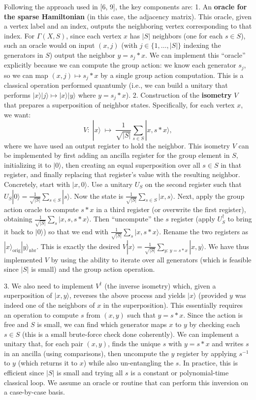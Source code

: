 \documentclass[11pt]{article}
\theoremstyle{definition}
\begin{document}
Following the approach used in [6, 9], the key components are:
1. An \textbf{oracle for the sparse Hamiltonian} (in this case, the adjacency matrix). This oracle, given a vertex label and an index, outputs the neighboring vertex corresponding to that index. For $\Gamma(X,S)$, since each vertex $x$ has $|S|$ neighbors (one for each $s \in S$), such an oracle would on input $(x, j)$ (with $j \in \{1,\dots,|S|\}$ indexing the generators in $S$) output the neighbor $y = s_j * x$. We can implement this “oracle” explicitly because we can compute the group action: we know each generator $s_j$, so we can map $(x, j) \mapsto s_j * x$ by a single group action computation. This is a classical operation performed quantumly (i.e., we can build a unitary that performs $|x\rangle|j\rangle \mapsto |x\rangle |y\rangle$ where $y = s_j * x$).
2. Construction of the \textbf{isometry} $V$ that prepares a superposition of neighbor states. Specifically, for each vertex $x$, we want:
\[ V:\; |x\rangle \;\mapsto\; \frac{1}{\sqrt{|S|}} \sum_{s \in S} |x, s* x\rangle, \] 
where we have used an output register to hold the neighbor. This isometry $V$ can be implemented by first adding an ancilla register for the group element in $S$, initializing it to $|0\rangle$, then creating an equal superposition over all $s \in S$ in that register, and finally replacing that register’s value with the resulting neighbor. Concretely, start with $|x, 0\rangle$. Use a unitary $U_S$ on the second register such that $U_S|0\rangle = \frac{1}{\sqrt{|S|}}\sum_{s\in S} |s\rangle$. Now the state is $\frac{1}{\sqrt{|S|}}\sum_{s\in S} |x, s\rangle$. Next, apply the group action oracle to compute $s * x$ in a third register (or overwrite the first register), obtaining $\frac{1}{\sqrt{|S|}}\sum_{s} |x, s, s*x\rangle$. Then “uncompute” the $s$ register (apply $U_S^\dagger$ to bring it back to $|0\rangle$) so that we end with $\frac{1}{\sqrt{|S|}}\sum_{s} |x, s*x\rangle$. Rename the two registers as $|x\rangle_{\text{orig}} |y\rangle_{\text{nbr}}$. This is exactly the desired $V|x\rangle = \frac{1}{\sqrt{|S|}}\sum_{y:\,y = s*x} |x, y\rangle$. We have thus implemented $V$ by using the ability to iterate over all generators (which is feasible since $|S|$ is small) and the group action operation.

3. We also need to implement $V^\dagger$ (the inverse isometry) which, given a superposition of $|x,y\rangle$, reverses the above process and yields $|x\rangle$ (provided $y$ was indeed one of the neighbors of $x$ in the superposition). This essentially requires an operation to compute $s$ from $(x,y)$ such that $y=s*x$. Since the action is free and $S$ is small, we can find which generator maps $x$ to $y$ by checking each $s \in S$ (this is a small brute-force check done coherently). We can implement a unitary that, for each pair $(x,y)$, finds the unique $s$ with $y=s*x$ and writes $s$ in an ancilla (using comparisons), then uncompute the $y$ register by applying $s^{-1}$ to $y$ (which returns it to $x$) while also un-entangling the $s$. In practice, this is efficient since $|S|$ is small and trying all $s$ is a constant or polynomial-time classical loop. We assume an oracle or routine that can perform this inversion on a case-by-case basis.
\end{document}
